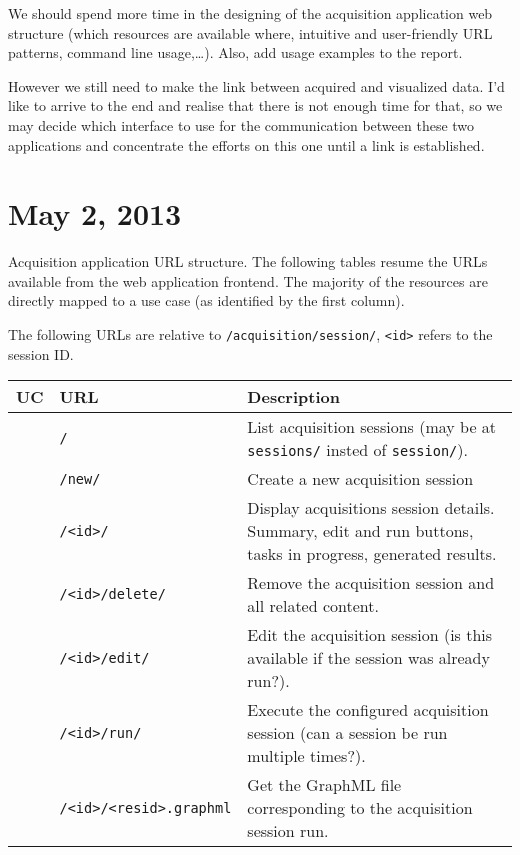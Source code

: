 We should spend more time in the designing of the acquisition application web structure (which resources are available where, intuitive and user-friendly URL patterns, command line usage,\ldots). Also, add usage examples to the report.

However we still need to make the link between acquired and visualized data. I'd like to arrive to the end and realise that there is not enough time for that, so we may decide which interface to use for the communication between these two applications and concentrate the efforts on this one until a link is established.

\section{May 2,  2013}

Acquisition application URL structure. The following tables resume the URLs available from the web application frontend. The majority of the resources are directly mapped to a use case (as identified by the first column).

\setcounter{uc}{0}
\newcommand{\rnum}[0]{
    \addtocounter{uc}{1}
    \padzeroes[2]{\decimal{uc}}
}

The following URLs are relative to \texttt{/acquisition/session/}, \texttt{<id>} refers to the session ID.

\begin{tabularx}{\linewidth}{ l | X | p{8.5cm} }
    \toprule
    \textbf{UC} & \textbf{URL} & \textbf{Description} \\
    \midrule
    \rnum & \texttt{/} & List acquisition sessions (may be at \texttt{sessions/} insted of \texttt{session/}). \\
    \rnum & \texttt{/new/} & Create a new acquisition session \\
    \rnum & \texttt{/<id>/} & Display acquisitions session details. Summary, edit and run buttons, tasks in progress, generated results. \\
    \rnum & \texttt{/<id>/delete/} & Remove the acquisition session and all related content. \\
    \rnum & \texttt{/<id>/edit/} & Edit the acquisition session (is this available if the session was already run?). \\
    \rnum & \texttt{/<id>/run/} & Execute the configured acquisition session (can a session be run multiple times?). \\
    \rnum & \footnotesize{\texttt{/<id>/<resid>.graphml}} & Get the GraphML file corresponding to the acquisition session run. \\
    \bottomrule
\end{tabularx}


